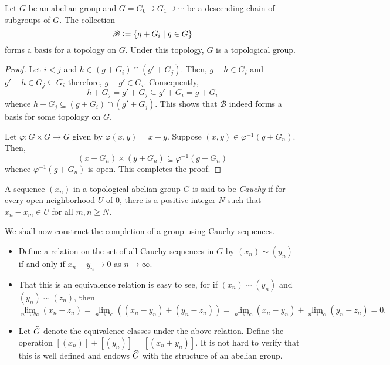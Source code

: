 \begin{proposition}
    Let $G$ be an abelian group and $G=G_0\supseteq G_1\supseteq\cdots$ be a descending chain of subgroups of $G$. The collection 
    \begin{equation*}
        \mathscr B := \{g + G_i\mid g\in G\}
    \end{equation*}
    forms a basis for a topology on $G$. Under this topology, $G$ is a topological group.
\end{proposition}
\begin{proof}
    Let $i < j$ and $h\in (g + G_i)\cap(g' + G_j)$. Then, $g - h\in G_i$ and $g' - h\in G_j\subseteq G_i$ therefore, $g - g'\in G_i$. Consequently, 
    \begin{equation*}
        h + G_j = g' + G_j\subseteq g' + G_i = g + G_i
    \end{equation*}
    whence $h + G_j\subseteq(g + G_i)\cap(g' + G_j)$. This shows that $\mathscr B$ indeed forms a basis for some topology on $G$.

    Let $\varphi: G\times G\to G$ given by $\varphi(x, y) = x - y$. Suppose $(x, y)\in\varphi^{-1}(g + G_n)$. Then, 
    \begin{equation*}
        (x + G_n)\times(y + G_n)\subseteq\varphi^{-1}(g + G_n)
    \end{equation*}
    whence $\varphi^{-1}(g + G_n)$ is open. This completes the proof.
\end{proof}

\begin{definition}
    A sequence $(x_n)$ in a topological abelian group $G$ is said to be \emph{Cauchy} if for every open neighborhood $U$ of $0$, there is a positive integer $N$ such that $x_n - x_m\in U$ for all $m,n\ge N$.
\end{definition}

We shall now construct the completion of a group using Cauchy sequences.
\begin{itemize}
    \item Define a relation on the set of all Cauchy sequences in $G$ by $(x_n)\sim (y_n)$ if and only if $x_n - y_n\to 0$ as $n\to\infty$.
    \item That this is an equivalence relation is easy to see, for if $(x_n)\sim(y_n)$ and $(y_n)\sim(z_n)$, then 
    \begin{equation*}
        \lim_{n\to\infty}(x_n - z_n) = \lim_{n\to\infty}\left((x_n - y_n) + (y_n - z_n)\right) = \lim_{n\to\infty}(x_n - y_n) + \lim_{n\to\infty}(y_n - z_n) = 0.
    \end{equation*}
    \item Let $\widehat{G}$ denote the equivalence classes under the above relation. Define the operation $[(x_n)] + [(y_n)] = [(x_n + y_n)]$. It is not hard to verify that this is well defined and endows $\widehat{G}$ with the structure of an abelian group.
\end{itemize}

